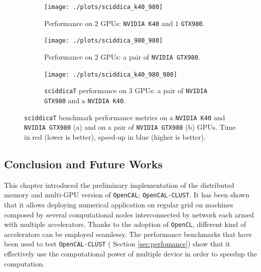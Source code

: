 \begin{figure}
	\begin{subfigure}{1.0\textwidth}
	
		\texttt{[image: ./plots/sciddica\_k40\_980]}
			\caption{Performance on $2$ GPUs: \texttt{NVIDIA K40} and $1$ \texttt{GTX980}.}
		\label{fig:sciddica_k40_980}
	\end{subfigure}        
	\endminipage \hfill

	\begin{subfigure}{1.0\textwidth}
		\texttt{[image: ./plots/sciddica\_980\_980]}
		\caption{Performance on $2$ GPUs: a pair of \texttt{NVIDIA GTX980}.}
		\label{fig:sciddica_980_980}
	\end{subfigure}
	\endminipage\hfill
	\begin{subfigure}{1.0\textwidth}
		\texttt{[image: ./plots/sciddica\_k40\_980\_980]}
		\caption[\texttt{sciddicaT} performance on $3$ GPUs.]{\texttt{sciddicaT} performance on $3$ GPUs: a pair of \texttt{NVIDIA GTX980} and a \texttt{NVIDIA K40}.}
		\label{fig:sciddica_k40_980_980}
	\end{subfigure}
	\endminipage\hfill
	
	\caption[\texttt{sciddicaT} benchmark performance metrics.]{\texttt{sciddicaT} benchmark performance metrics on a \texttt{NVIDIA K40} and \texttt{NVIDIA GTX980} (a) and on  a pair of \texttt{NVIDIA GTX980} (b) GPUs. Time in red (lower is better), speed-up in blue (higher is better).}
	\label{fig:sciddica_performance}
\end{figure}

\subsection{Conclusion and Future Works}
This chapter introduced the preliminary implementation of the distributed memory and multi-GPU  version of \texttt{OpenCAL}: \texttt{OpenCAL-CLUST}.
It has been shown that it allows deploying numerical application on regular grid on machines composed by several computational nodes interconnected by network each armed with multiple accelerators. Thanks to the adoption of \texttt{OpenCL}, different kind of accelerators can be employed seamlessy.
The performance benchmarks that have been used to test \texttt{OpenCAL-CLUST} ( Section \ref{sec:perfomance}) show that it effectively use the computational power of multiple device in order to speedup the computation.

